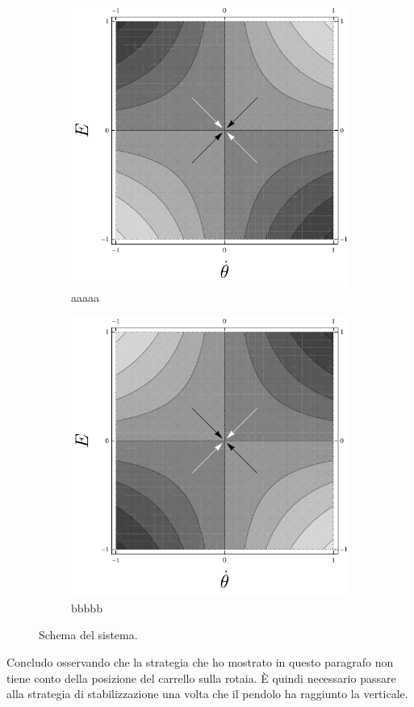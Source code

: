 \begin{figure}[b]
    \centering
    \begin{subfigure}[b]{0.48\textwidth}
        \centering
        \includegraphics[width=\textwidth]{assets/energy-control3}
        \caption{aaaaa}
    \end{subfigure}
    \hfill
    \begin{subfigure}[b]{0.48\textwidth}
        \centering
        \includegraphics[width=\textwidth]{assets/energy-control4}
        \caption{bbbbb}
    \end{subfigure}
    \caption{Schema del sistema.} %
    \label{fig:energy-control-better}
\end{figure}

Concludo osservando che la strategia che ho mostrato in questo paragrafo
non tiene conto della posizione del carrello sulla rotaia.
È quindi necessario passare alla strategia di stabilizzazione
una volta che il pendolo ha raggiunto la verticale.